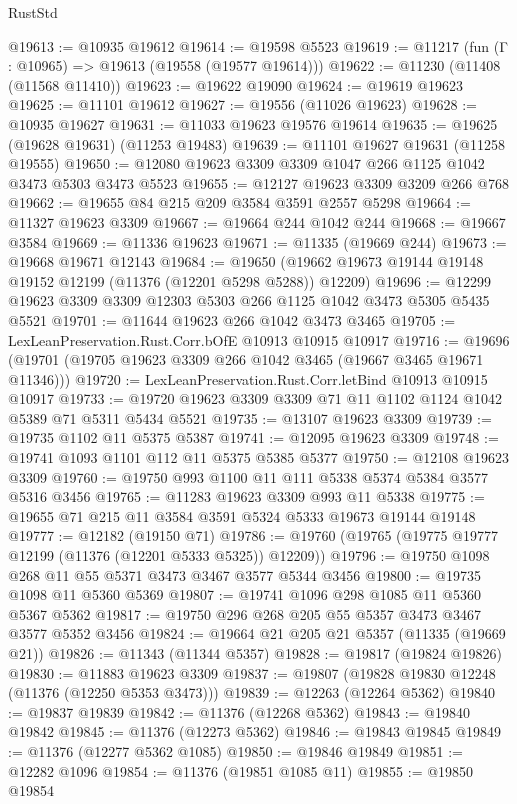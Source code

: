 \begin{lexlean}{RustStd}
\begin{coremodule}
{{{{{{{{{{{{{{{{{{{@19613 := @10935 @19612
@19614 := @19598 @5523
@19619 := @11217 (fun (Γ : @10965) => @19613 (@19558 (@19577 @19614)))
@19622 := @11230 (@11408 (@11568 @11410))
@19623 := @19622 @19090
@19624 := @19619 @19623
@19625 := @11101 @19612
@19627 := @19556 (@11026 @19623)
@19628 := @10935 @19627
@19631 := @11033 @19623 @19576 @19614
@19635 := @19625 (@19628 @19631) (@11253 @19483)
@19639 := @11101 @19627 @19631 (@11258 @19555)
@19650 := @12080 @19623 @3309 @3309 @1047 @266 @1125 @1042 @3473 @5303 @3473 @5523
@19655 := @12127 @19623 @3309 @3209 @266 @768
@19662 := @19655 @84 @215 @209 @3584 @3591 @2557 @5298
@19664 := @11327 @19623 @3309
@19667 := @19664 @244 @1042 @244
@19668 := @19667 @3584
@19669 := @11336 @19623
@19671 := @11335 (@19669 @244)
@19673 := @19668 @19671 @12143
@19684 := @19650 (@19662 @19673 @19144 @19148 @19152 @12199 (@11376 (@12201 @5298 @5288)) @12209)
@19696 := @12299 @19623 @3309 @3309 @12303 @5303 @266 @1125 @1042 @3473 @5305 @5435 @5521
@19701 := @11644 @19623 @266 @1042 @3473 @3465
@19705 := LexLeanPreservation.Rust.Corr.bOfE @10913 @10915 @10917
@19716 := @19696 (@19701 (@19705 @19623 @3309 @266 @1042 @3465 (@19667 @3465 @19671 @11346)))
@19720 := LexLeanPreservation.Rust.Corr.letBind @10913 @10915 @10917
@19733 := @19720 @19623 @3309 @3309 @71 @11 @1102 @1124 @1042 @5389 @71 @5311 @5434 @5521
@19735 := @13107 @19623 @3309
@19739 := @19735 @1102 @11 @5375 @5387
@19741 := @12095 @19623 @3309
@19748 := @19741 @1093 @1101 @112 @11 @5375 @5385 @5377
@19750 := @12108 @19623 @3309
@19760 := @19750 @993 @1100 @11 @111 @5338 @5374 @5384 @3577 @5316 @3456
@19765 := @11283 @19623 @3309 @993 @11 @5338
@19775 := @19655 @71 @215 @11 @3584 @3591 @5324 @5333 @19673 @19144 @19148
@19777 := @12182 (@19150 @71)
@19786 := @19760 (@19765 (@19775 @19777 @12199 (@11376 (@12201 @5333 @5325)) @12209))
@19796 := @19750 @1098 @268 @11 @55 @5371 @3473 @3467 @3577 @5344 @3456
@19800 := @19735 @1098 @11 @5360 @5369
@19807 := @19741 @1096 @298 @1085 @11 @5360 @5367 @5362
@19817 := @19750 @296 @268 @205 @55 @5357 @3473 @3467 @3577 @5352 @3456
@19824 := @19664 @21 @205 @21 @5357 (@11335 (@19669 @21))
@19826 := @11343 (@11344 @5357)
@19828 := @19817 (@19824 @19826)
@19830 := @11883 @19623 @3309
@19837 := @19807 (@19828 @19830 @12248 (@11376 (@12250 @5353 @3473)))
@19839 := @12263 (@12264 @5362)
@19840 := @19837 @19839
@19842 := @11376 (@12268 @5362)
@19843 := @19840 @19842
@19845 := @11376 (@12273 @5362)
@19846 := @19843 @19845
@19849 := @11376 (@12277 @5362 @1085)
@19850 := @19846 @19849
@19851 := @12282 @1096
@19854 := @11376 (@19851 @1085 @11)
@19855 := @19850 @19854
}}}}}}}}}}}}}}}}}}}
\end{coremodule}
\end{lexlean}
